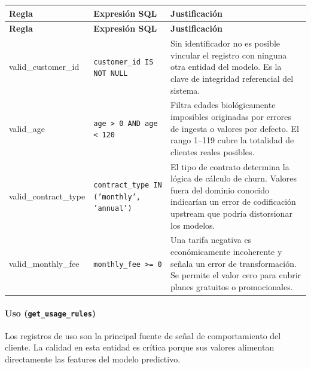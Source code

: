 \documentclass[12pt,a4paper]{article}
\begin{document}
\begin{longtable}{>{\ttfamily}p{4.2cm} p{5.5cm} p{5.5cm}}
\toprule
\textbf{Regla} & \textbf{Expresión SQL} & \textbf{Justificación} \\
\midrule
\endfirsthead
\toprule
\textbf{Regla} & \textbf{Expresión SQL} & \textbf{Justificación} \\
\midrule
\endhead
\bottomrule
\endlastfoot
valid\_customer\_id & \texttt{customer\_id IS NOT NULL} & Sin identificador no es posible vincular el registro con ninguna otra entidad del modelo. Es la clave de integridad referencial del sistema. \\[4pt]
valid\_age & \texttt{age > 0 AND age < 120} & Filtra edades biológicamente imposibles originadas por errores de ingesta o valores por defecto. El rango 1--119 cubre la totalidad de clientes reales posibles. \\[4pt]
valid\_contract\_type & \texttt{contract\_type IN ('monthly', 'annual')} & El tipo de contrato determina la lógica de cálculo de churn. Valores fuera del dominio conocido indicarían un error de codificación upstream que podría distorsionar los modelos. \\[4pt]
valid\_monthly\_fee & \texttt{monthly\_fee >= 0} & Una tarifa negativa es económicamente incoherente y señala un error de transformación. Se permite el valor cero para cubrir planes gratuitos o promocionales. \\
\end{longtable}

\paragraph{Uso (\texttt{get\_usage\_rules})}

Los registros de uso son la principal fuente de señal de comportamiento del cliente. La calidad en esta entidad es crítica porque sus valores alimentan directamente las features del modelo predictivo.
\end{document}
